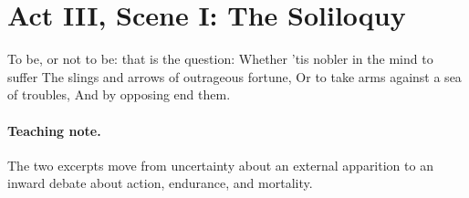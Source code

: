 \section*{Act III, Scene I: The Soliloquy}
 To be, or not to be: that is the question:
Whether 'tis nobler in the mind to suffer
The slings and arrows of outrageous fortune,
Or to take arms against a sea of troubles,
And by opposing end them.

\paragraph{Teaching note.}
The two excerpts move from uncertainty about an external apparition to an
inward debate about action, endurance, and mortality.
